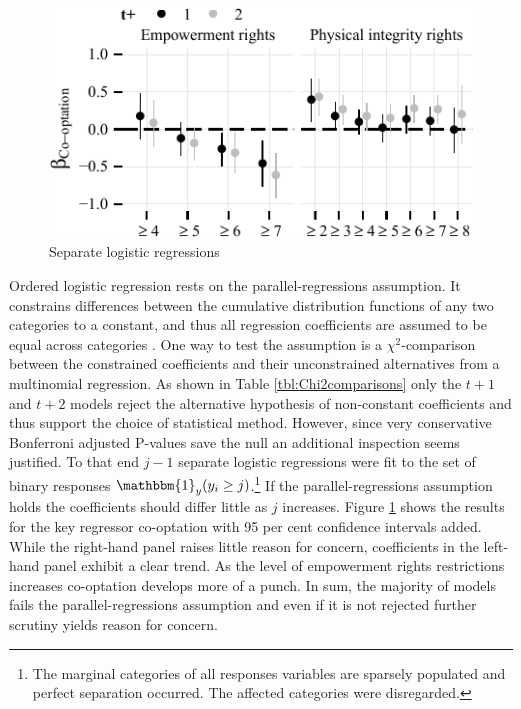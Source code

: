 \begin{figure}
\centering
\includegraphics[width=\linewidth]{./sections/03replication/parallelRegressionsCoefPlot_manualLabels.pdf}
\caption{Separate logistic regressions}
\label{fig:separateLogisticCoef}
\end{figure}
Ordered logistic regression rests on the 
parallel-regressions assumption. It constrains differences 
between the cumulative distribution functions of any two 
categories to a constant, and thus all regression 
coefficients are assumed to be equal across categories 
\citep[476]{Fox.2008}. One way to test the assumption is a 
$\chi^2$-comparison between the constrained coefficients and 
their unconstrained alternatives from a multinomial 
regression. As shown in Table \ref{tbl:Chi2comparisons} only
the $t+1$ and $t+2$ models reject the alternative hypothesis 
of non-constant coefficients and thus support the choice of
statistical method. However, since very conservative 
Bonferroni adjusted P-values save the null an additional
inspection seems justified. To that end $j-1$ separate 
logistic regressions were fit to the set of binary responses 
$\mathbbm{1}_y(y_{i} \ge j)$.\footnote{The marginal 
categories of all responses variables are sparsely populated
and perfect separation occurred. The affected categories were 
disregarded.} If the parallel-regressions assumption holds 
the coefficients should differ little as $j$ increases. 
Figure \ref{fig:separateLogisticCoef} shows the results for 
the key regressor co-optation with 95 per cent confidence 
intervals added. While the right-hand panel raises little 
reason for concern, coefficients in the left-hand panel 
exhibit a clear trend. As the level of empowerment rights 
restrictions increases co-optation develops more of a punch.
In sum, the majority of models fails the parallel-regressions 
assumption and even if it is not rejected further scrutiny 
yields reason for concern.

